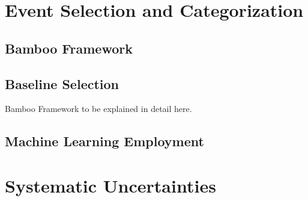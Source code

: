\section{Event Selection and Categorization}

\subsection{Bamboo Framework}

\subsection{Baseline Selection}

Bamboo Framework to be explained in detail here.

\subsection{Machine Learning Employment}

\section{Systematic Uncertainties}

